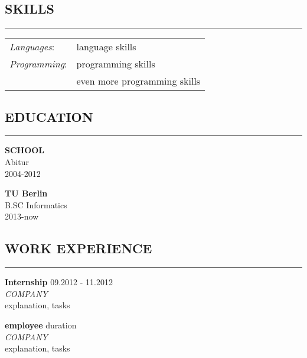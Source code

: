 \documentclass[12pt, a4paper, titlepage]{article}
\begin{document}
\begin{minipage}[t]{.62 \textwidth}
	\vspace{0pt}
	\begin{flushleft}
		
		\vskip5mm
		
		\subsection*{SKILLS}
		\hrule
		\vskip2mm
		\begin{tabular}{l l}
			\textit{Languages}: & language skills\\
			\textit{Programming}: & programming skills\\
			 & even more programming skills
		\end{tabular}
	
		\vskip5mm
		
		\subsection*{EDUCATION}
		\hrule
		\vskip2mm
		\textbf{SCHOOL} \\
		Abitur \\
		2004-2012
		
		\vskip2mm
		
		\textbf{TU Berlin} \\
		B.SC Informatics \\
		2013-now
		
		\vskip5mm
		
		\subsection*{WORK EXPERIENCE}
		\hrule
		\vskip2mm
		
		\textbf{Internship} \hfill 09.2012 - 11.2012 \\
		\textit{COMPANY} \\
		explanation, tasks \\
		
		\vskip3mm
		
		\textbf{employee} \hfill duration \\
		\textit{COMPANY} \\
		explanation, tasks \\
	\end{flushleft}
\end{minipage}
\end{document}
